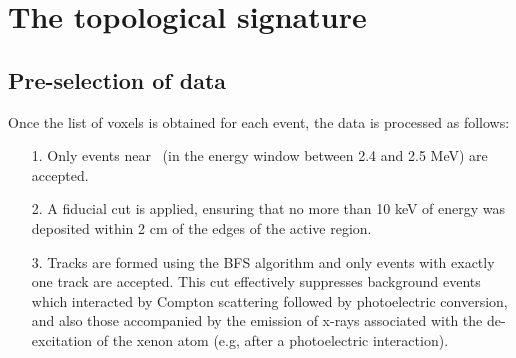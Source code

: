 \documentclass[a4paper,11pt]{article}
\begin{document}

\section{The topological signature}
\label{sec.top}

\subsection{Pre-selection of data}
\label{ssec.prep}

 Once the list of voxels is obtained for each event, the data is processed as follows: 
\begin{enumerate}
	\item[1.] Only events near \Qbb\ (in the energy window between 2.4 and 2.5 MeV) are accepted.
	\item[2.] A fiducial cut is applied, ensuring that no more than 10 keV of energy was deposited within 2 cm of the edges of the active region.
	\item[3.] Tracks are formed using the BFS algorithm and only events with exactly one track are accepted.  This cut effectively suppresses background events which interacted by Compton scattering followed by photoelectric conversion, and also those accompanied by the emission of x-rays associated with the de-excitation of the xenon atom (e.g, after a photoelectric interaction). 
\end{enumerate}
\end{document}
